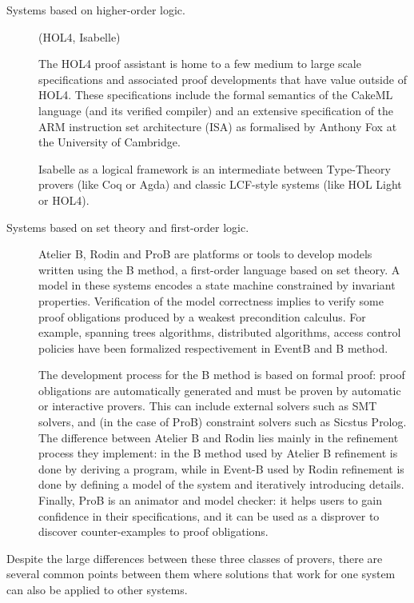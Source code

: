 \begin{description}
  \item[Systems based on higher-order logic.] (HOL4, Isabelle)

  The HOL4 proof assistant is home to a few medium to large scale
  specifications and associated proof developments that have value
  outside of HOL4. These specifications include the formal semantics
  of the CakeML language (and its verified compiler) and an extensive
  specification of the ARM instruction set architecture (ISA) as
  formalised by Anthony Fox at the University of Cambridge.

  Isabelle as a logical framework \cite{paulson700} is an intermediate
  between Type-Theory provers (like Coq or Agda) and classic LCF-style
  systems (like HOL Light or HOL4).

  \item[Systems based on set theory and first-order logic.] Atelier B,
  Rodin and ProB are platforms or tools to develop models written
  using the B method, a first-order language based on set theory. A
  model in these systems encodes a state machine constrained by
  invariant properties. Verification of the model correctness implies
  to verify some proof obligations produced by a weakest precondition
  calculus. For example, spanning trees algorithms, distributed
  algorithms, access control policies have been formalized
  respectivement in EventB and B method.

  The development process for the B method is based on formal proof:
  proof obligations are automatically generated and must be proven by
  automatic or interactive provers. This can include external solvers
  such as SMT solvers, and (in the case of ProB) constraint solvers
  such as Sicstus Prolog. The difference between Atelier B and Rodin
  lies mainly in the refinement process they implement: in the B
  method used by Atelier B refinement is done by deriving a program,
  while in Event-B used by Rodin refinement is done by defining a
  model of the system and iteratively introducing details. Finally,
  ProB is an animator and model checker: it helps users to gain
  confidence in their specifications, and it can be used as a
  disprover to discover counter-examples to proof obligations.

\end{description}
Despite the large differences between these three classes of provers,
there are several common points between them where solutions that work
for one system can also be applied to other systems.
%
